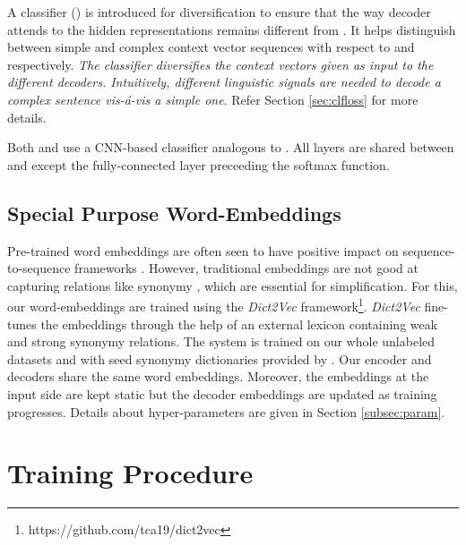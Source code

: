\documentclass[11pt,a4paper]{article}
\begin{document}
A classifier () is introduced for diversification to ensure that the way decoder  attends to the hidden representations remains different from . It helps distinguish between simple and complex context vector sequences with respect to   and  respectively. \emph{The classifier  diversifies the context vectors given as input to the different decoders. Intuitively, different linguistic signals are needed to decode a complex sentence \textit{vis-\'a-vis} a simple one}. Refer Section \ref{sec:clfloss} for more details. 

Both   and  use a CNN-based classifier analogous to . All layers are shared between  and  except the fully-connected layer preceeding the softmax function.

\subsection{Special Purpose Word-Embeddings}
Pre-trained word embeddings are often seen to have positive impact on  sequence-to-sequence frameworks \cite{cho2014properties,qi2018and}. However, traditional embeddings are not good at capturing relations like synonymy \cite{tissier2017dict2vec}, which are essential for simplification. For this, our word-embeddings are trained using the \textit{Dict2Vec} framework\footnote{https://github.com/tca19/dict2vec}. \textit{Dict2Vec} fine-tunes the embeddings through the help of an external lexicon containing weak and strong synonymy relations. The system is trained on our whole unlabeled datasets and with seed synonymy dictionaries provided by . Our encoder and decoders share the same word embeddings. Moreover, the embeddings at the input side are kept static but the decoder embeddings are updated as training progresses. Details about hyper-parameters are given in Section \ref{subsec:param}.

 \section{Training Procedure}
\label{sec:training}

\def\xs {}
\def\xd {}
\def\S {}
\def\Sh {}
\def\D {} 
\def\Dh {}
\def\belongsto {}
\def\Enc {}
\def\G {}
\def\Ds {}
\def\Dd {}
\def\C {}
\def\thetaE{\boldsymbol{\theta_E}}
\def\thetaG{\boldsymbol{\theta_G}}
\def\thetaGs{\boldsymbol{\theta_{G_s}}}
\def\thetaGd{\boldsymbol{\theta_{G_d}}}
\def\thetaDs{\boldsymbol{\theta_{D_s}}}
\def\thetaC{\boldsymbol{\theta_{C}}}
\def\thetaD{\boldsymbol{\theta_{D}}}
\def\thetaDd{\boldsymbol{\theta_{D_d}}}
\def\simplf{}
\def\simplfm{\boldsymbol{E-G_s}}
\def\pipe{\boldsymbol{E-G}}
\def\fpipe{\boldsymbol{E-G}}
\def\compl{}
\def\complm{\boldsymbol{E-G_d}}
\def\Lrec{\mathcal{L_rec}}
\end{document}
